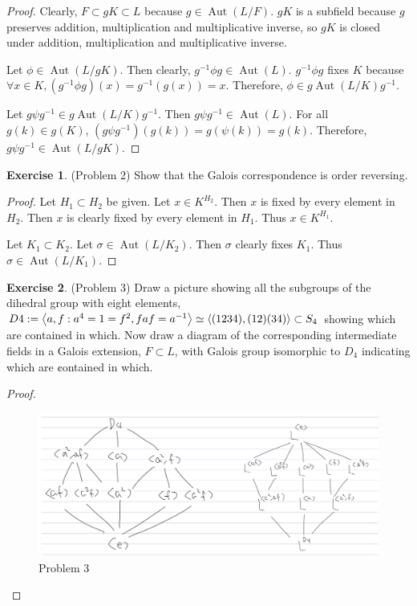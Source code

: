 \documentclass[12pt, psamsfonts]{amsart}
\theoremstyle{definition}
\newtheorem*{exer}{Exercise}
\theoremstyle{remark}
\DeclareMathOperator{\Aut}{Aut}
\numberwithin{equation}{section}
\begin{document}
\begin{proof}
  Clearly, $F \subset gK \subset L$ because $g \in \Aut(L / F)$.
  $gK$ is a subfield because $g$ preserves addition, multiplication and multiplicative inverse, so $gK$ is closed under addition, multiplication and multiplicative inverse.

  Let $\phi \in \Aut(L/gK)$.
  Then clearly, $g^{-1}\phi g \in \Aut(L)$.
  $g^{-1}\phi g$ fixes $K$ because $\forall x \in K, (g^{-1}\phi g)(x) = g^{-1}(g(x)) = x$.
  Therefore, $\phi \in g\Aut(L/K)g^{-1}$.

  Let $g\psi g^{-1} \in g\Aut(L/K)g^{-1}$.
  Then $g\psi g^{-1} \in \Aut(L)$.
  For all $g(k) \in g(K)$, $(g\psi g^{-1})(g(k)) = g(\psi(k)) = g(k)$.
  Therefore, $g\psi g^{-1} \in \Aut(L/gK)$.
\end{proof}

\begin{exer}{(Problem 2)}
  Show that the Galois correspondence is order reversing.
\end{exer}

\begin{proof}
  Let $H_1 \subset H_2$ be given.
  Let $x \in K^{H_2}$.
  Then $x$ is fixed by every element in $H_2$.
  Then $x$ is clearly fixed by every element in $H_1$.
  Thus $x \in K^{H_1}$.

  Let $K_1 \subset K_2$.
  Let $\sigma \in \Aut(L/K_2)$.
  Then $\sigma$ clearly fixes $K_1$.
  Thus $\sigma \in \Aut(L/K_1)$.
\end{proof}


\begin{exer}{(Problem 3)}
  Draw a picture showing all the subgroups of the dihedral group with eight elements, $D4 := \ev{a , f: a^4 = 1 = f^2, faf = a^{-1}} \simeq \ev{(1234),(12)(34)} \subset S_4$ showing which are contained in which.
  Now draw a diagram of the corresponding intermediate fields in a Galois extension, $F \subset L$, with Galois group isomorphic to $D_4$ indicating which are ¢ontained in which.
\end{exer}

\begin{proof}
  \begin{figure}
    \includegraphics[width=\linewidth]{problem3.jpg}
    \caption{Problem 3}
    \label{fig:problem3}
  \end{figure}
\end{proof}
\end{document}
